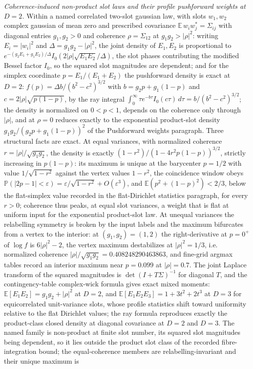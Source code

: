 \emph{Coherence-induced non-product slot laws and their profile pushforward weights at \(D=2\).} Within a named correlated two-slot gaussian law, with slots \(w_{1},w_{2}\) complex gaussian of mean zero and prescribed covariance \(\mathbb{E}\,w_{i}w_{j}^{*}=\Sigma_{ij}\) with diagonal entries \(g_{1},g_{2}>0\) and coherence \(\rho=\Sigma_{12}\) at \(g_{1}g_{2}>\lvert\rho\rvert^{2}\): writing \(E_{i}=\lvert w_{i}\rvert^{2}\) and \(\Delta=g_{1}g_{2}-\lvert\rho\rvert^{2}\), the joint density of \(E_{1},E_{2}\) is proportional to \(e^{-(g_{2}E_{1}+g_{1}E_{2})/\Delta}I_{0}(2\lvert\rho\rvert\sqrt{E_{1}E_{2}}/\Delta)\), the slot phases contributing the modified Bessel factor \(I_{0}\), so the squared slot magnitudes are dependent; and for the simplex coordinate \(p=E_{1}/(E_{1}+E_{2})\) the pushforward density is exact at \(D=2\): \(f(p)=\Delta b/(b^{2}-c^{2})^{3/2}\) with \(b=g_{2}p+g_{1}(1-p)\) and \(c=2\lvert\rho\rvert\sqrt{p(1-p)}\), by the ray integral \(\int_{0}^{\infty}\tau e^{-b\tau}I_{0}(c\tau)\,d\tau=b/(b^{2}-c^{2})^{3/2}\); the density is normalized on \(0<p<1\), depends on the coherence only through \(\lvert\rho\rvert\), and at \(\rho=0\) reduces exactly to the exponential product-slot density \(g_{1}g_{2}/(g_{2}p+g_{1}(1-p))^{2}\) of the Pushforward weights paragraph. Three structural facts are exact. At equal variances, with normalized coherence \(r=\lvert\rho\rvert/\sqrt{g_{1}g_{2}}\), the density is exactly \((1-r^{2})/(1-4r^{2}p(1-p))^{3/2}\), strictly increasing in \(p(1-p)\): its maximum is unique at the barycenter \(p=1/2\) with value \(1/\sqrt{1-r^{2}}\) against the vertex values \(1-r^{2}\), the coincidence window obeys \(\mathbb{P}(\lvert 2p-1\rvert<\varepsilon)=\varepsilon/\sqrt{1-r^{2}}+O(\varepsilon^{3})\), and \(\mathbb{E}(p^{2}+(1-p)^{2})<2/3\), below the flat-simplex value recorded in the flat-Dirichlet statistics paragraph, for every \(r>0\); coherence thus peaks, at equal slot variances, a weight that is flat at uniform input for the exponential product-slot law. At unequal variances the relabelling symmetry is broken by the input labels and the maximum bifurcates from a vertex to the interior: at \((g_{1},g_{2})=(1,2)\) the right-derivative at \(p=0^{+}\) of \(\log f\) is \(6\lvert\rho\rvert^{2}-2\), the vertex maximum destabilizes at \(\lvert\rho\rvert^{2}=1/3\), i.e. normalized coherence \(\lvert\rho\rvert/\sqrt{g_{1}g_{2}}=0.408248290463863\), and fine-grid argmax tables record an interior maximum near \(p=0.099\) at \(\lvert\rho\rvert=0.7\). The joint Laplace transform of the squared magnitudes is \(\det(I+T\Sigma)^{-1}\) for diagonal \(T\), and the contingency-table complex-wick formula gives exact mixed moments: \(\mathbb{E}[E_{1}E_{2}]=g_{1}g_{2}+\lvert\rho\rvert^{2}\) at \(D=2\), and \(\mathbb{E}[E_{1}E_{2}E_{3}]=1+3t^{2}+2t^{3}\) at \(D=3\) for equicorrelated unit-variance slots, whose profile statistics shift toward uniformity relative to the flat Dirichlet values; the ray formula reproduces exactly the product-class closed density at diagonal covariance at \(D=2\) and \(D=3\). The named family is non-product at finite slot number, its squared slot magnitudes being dependent, so it lies outside the product slot class of the recorded fibre-integration bound; the equal-coherence members are relabelling-invariant and their unique maximum is 